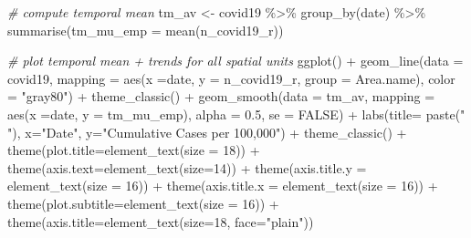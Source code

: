 \documentclass[
]{book}
\newenvironment{Shaded}{\begin{snugshade}}{\end{snugshade}}
\newcommand{\AttributeTok}[1]{\textcolor[rgb]{0.77,0.63,0.00}{#1}}
\newcommand{\CommentTok}[1]{\textcolor[rgb]{0.56,0.35,0.01}{\textit{#1}}}
\newcommand{\ConstantTok}[1]{\textcolor[rgb]{0.00,0.00,0.00}{#1}}
\newcommand{\DecValTok}[1]{\textcolor[rgb]{0.00,0.00,0.81}{#1}}
\newcommand{\FloatTok}[1]{\textcolor[rgb]{0.00,0.00,0.81}{#1}}
\newcommand{\FunctionTok}[1]{\textcolor[rgb]{0.00,0.00,0.00}{#1}}
\newcommand{\NormalTok}[1]{#1}
\newcommand{\OtherTok}[1]{\textcolor[rgb]{0.56,0.35,0.01}{#1}}
\newcommand{\SpecialCharTok}[1]{\textcolor[rgb]{0.00,0.00,0.00}{#1}}
\newcommand{\StringTok}[1]{\textcolor[rgb]{0.31,0.60,0.02}{#1}}
\begin{document}
\begin{Shaded}
\begin{Highlighting}[]
\CommentTok{\# compute temporal mean}
\NormalTok{tm\_av }\OtherTok{\textless{}{-}}\NormalTok{ covid19 }\SpecialCharTok{\%\textgreater{}\%} \FunctionTok{group\_by}\NormalTok{(date) }\SpecialCharTok{\%\textgreater{}\%}
  \FunctionTok{summarise}\NormalTok{(}\AttributeTok{tm\_mu\_emp =} \FunctionTok{mean}\NormalTok{(n\_covid19\_r))}

\CommentTok{\# plot temporal mean + trends for all spatial units}
\FunctionTok{ggplot}\NormalTok{() }\SpecialCharTok{+}
  \FunctionTok{geom\_line}\NormalTok{(}\AttributeTok{data =}\NormalTok{ covid19, }\AttributeTok{mapping =} \FunctionTok{aes}\NormalTok{(}\AttributeTok{x =}\NormalTok{date, }\AttributeTok{y =}\NormalTok{ n\_covid19\_r,}
                          \AttributeTok{group =}\NormalTok{ Area.name), }\AttributeTok{color =} \StringTok{"gray80"}\NormalTok{) }\SpecialCharTok{+}
   \FunctionTok{theme\_classic}\NormalTok{() }\SpecialCharTok{+}
  \FunctionTok{geom\_smooth}\NormalTok{(}\AttributeTok{data =}\NormalTok{ tm\_av, }\AttributeTok{mapping =} \FunctionTok{aes}\NormalTok{(}\AttributeTok{x =}\NormalTok{date, }\AttributeTok{y =}\NormalTok{ tm\_mu\_emp), }
              \AttributeTok{alpha =} \FloatTok{0.5}\NormalTok{,}
              \AttributeTok{se =} \ConstantTok{FALSE}\NormalTok{) }\SpecialCharTok{+}
    \FunctionTok{labs}\NormalTok{(}\AttributeTok{title=} \FunctionTok{paste}\NormalTok{(}\StringTok{" "}\NormalTok{), }\AttributeTok{x=}\StringTok{"Date"}\NormalTok{, }\AttributeTok{y=}\StringTok{"Cumulative Cases per 100,000"}\NormalTok{) }\SpecialCharTok{+}
    \FunctionTok{theme\_classic}\NormalTok{() }\SpecialCharTok{+}
    \FunctionTok{theme}\NormalTok{(}\AttributeTok{plot.title=}\FunctionTok{element\_text}\NormalTok{(}\AttributeTok{size =} \DecValTok{18}\NormalTok{)) }\SpecialCharTok{+}
    \FunctionTok{theme}\NormalTok{(}\AttributeTok{axis.text=}\FunctionTok{element\_text}\NormalTok{(}\AttributeTok{size=}\DecValTok{14}\NormalTok{)) }\SpecialCharTok{+}
    \FunctionTok{theme}\NormalTok{(}\AttributeTok{axis.title.y =} \FunctionTok{element\_text}\NormalTok{(}\AttributeTok{size =} \DecValTok{16}\NormalTok{)) }\SpecialCharTok{+}
    \FunctionTok{theme}\NormalTok{(}\AttributeTok{axis.title.x =} \FunctionTok{element\_text}\NormalTok{(}\AttributeTok{size =} \DecValTok{16}\NormalTok{)) }\SpecialCharTok{+}
    \FunctionTok{theme}\NormalTok{(}\AttributeTok{plot.subtitle=}\FunctionTok{element\_text}\NormalTok{(}\AttributeTok{size =} \DecValTok{16}\NormalTok{)) }\SpecialCharTok{+}
    \FunctionTok{theme}\NormalTok{(}\AttributeTok{axis.title=}\FunctionTok{element\_text}\NormalTok{(}\AttributeTok{size=}\DecValTok{18}\NormalTok{, }\AttributeTok{face=}\StringTok{"plain"}\NormalTok{))}
\end{Highlighting}
\end{Shaded}
\end{document}
